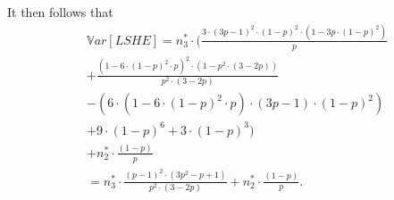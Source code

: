 \documentclass{imsart}
\begin{document}
It then follows that
\begin{equation*}
\begin{split}
&\mathbb{V}ar[LSHE]=n_3^*\cdot\Big(\frac{3\cdot(3p-1)^2\cdot(1-p)^2\cdot(1-3p\cdot(1-p)^2)}{p}\\
&+\frac{(1-6\cdot(1-p)^2\cdot p)^2\cdot(1-p^2\cdot(3-2p))}{p^2\cdot(3-2p)}\\
&-(6\cdot(1-6\cdot(1-p)^2\cdot p)\cdot(3p-1)\cdot(1-p)^2)\\
&+ 9\cdot(1-p)^6+3\cdot(1-p)^3 \Big)\\
&+ n_2^*\cdot\frac{(1-p)}{p}\\
&= n_3^* \cdot \frac{(p-1)^2 \cdot (3p^2-p+1)}{p^2 \cdot (3-2p)} + n_2^* \cdot \frac{(1-p)}{p}.
\end{split}
\end{equation*}
\end{document}
